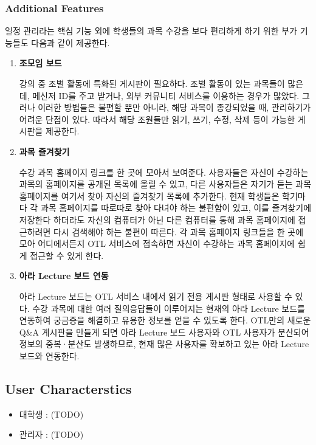 \documentclass[a4paper,titlepage]{article}
\begin{document}
\subsubsection{Additional Features}
일정 관리라는 핵심 기능 외에 학생들의 과목 수강을 보다 편리하게 하기 위한 부가 기능들도 다음과 같이 제공한다.
\begin{enumerate}
	\item\textbf{조모임 보드}

	강의 중 조별 활동에 특화된 게시판이 필요하다.
	조별 활동이 있는 과목들이 많은데, 메신저 ID를 주고 받거나, 외부 커뮤니티 서비스를 이용하는 경우가 많았다.
	그러나 이러한 방법들은 불편할 뿐만 아니라, 해당 과목이 종강되었을 때, 관리하기가 어려운 단점이 있다. 
	따라서 해당 조원들만 읽기, 쓰기, 수정, 삭제 등이 가능한 게시판을 제공한다. 

	\item\textbf{과목 즐겨찾기}

	수강 과목 홈페이지 링크를 한 곳에 모아서 보여준다.
	사용자들은 자신이 수강하는 과목의 홈페이지를 공개된 목록에 올릴 수 있고, 다른 사용자들은 자기가 듣는 과목 홈페이지를 여기서 찾아 자신의 즐겨찾기 목록에 추가한다.
	현재 학생들은 학기마다 각 과목 홈페이지를 따로따로 찾아 다녀야 하는 불편함이 있고, 이를 즐겨찾기에 저장한다 하더라도 자신의 컴퓨터가 아닌 다른 컴퓨터를 통해 과목 홈페이지에 접근하려면 다시 검색해야 하는 불편이 따른다.
	각 과목 홈페이지 링크들을 한 곳에 모아 어디에서든지 OTL 서비스에 접속하면 자신이 수강하는 과목 홈페이지에 쉽게 접근할 수 있게 한다. 

	\item\textbf{아라 Lecture 보드 연동}

	아라 Lecture 보드는 OTL 서비스 내에서 읽기 전용 게시판 형태로 사용할 수 있다.
	수강 과목에 대한 여러 질의응답들이 이루어지는 현재의 아라 Lecture 보드를 연동하여 궁금증을 해결하고 유용한 정보를 얻을 수 있도록 한다.
	OTL만의 새로운 Q\&A 게시판을 만들게 되면 아라 Lecture 보드 사용자와 OTL 사용자가 분산되어 정보의 중복·분산도 발생하므로, 현재 많은 사용자를 확보하고 있는 아라 Lecture 보드와 연동한다.

\end{enumerate}

\subsection{User Characterstics}

\begin{itemize}

	\item 대학생 : (TODO)

	\item 관리자 : (TODO)

\end{itemize}
\end{document}
